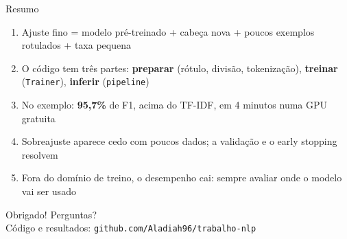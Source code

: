 \documentclass[aspectratio=169,10pt]{beamer}
\newcommand{\destaque}[1]{{\color{azul}\bfseries #1}}
\begin{document}
\begin{frame}{Resumo}
  \begin{enumerate}
    \item Ajuste fino = modelo pré-treinado + cabeça nova + poucos exemplos rotulados + taxa pequena
    \item O código tem três partes: \textbf{preparar} (rótulo, divisão, tokenização), \textbf{treinar} (\texttt{Trainer}), \textbf{inferir} (\texttt{pipeline})
    \item No exemplo: \destaque{95,7\%} de F1, acima do TF-IDF, em 4 minutos numa GPU gratuita
    \item Sobreajuste aparece cedo com poucos dados; a validação e o early stopping resolvem
    \item Fora do domínio de treino, o desempenho cai: \alert{sempre avaliar onde o modelo vai ser usado}
  \end{enumerate}
  \vspace{1em}
  \centering
  {\large Obrigado! Perguntas?}\\[4pt]
  \small Código e resultados: \texttt{github.com/Aladiah96/trabalho-nlp}
\end{frame}
\end{document}

